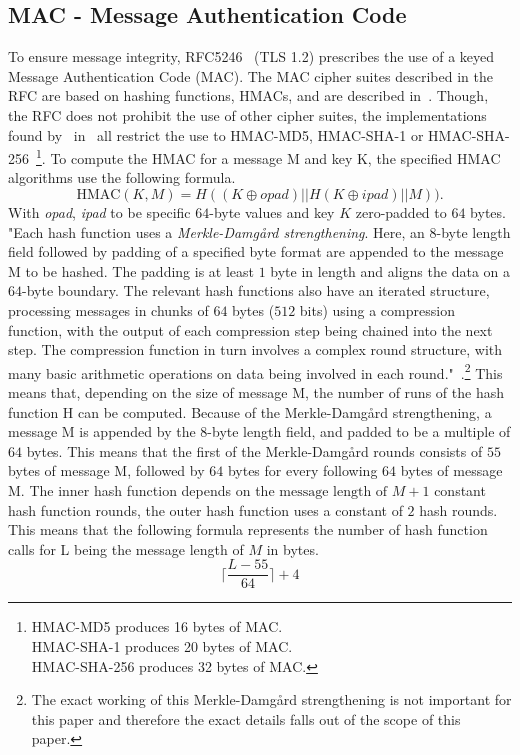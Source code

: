 \documentclass[10pt,conference,a4paper]{IEEEtran}
\begin{document}
\subsection{MAC - Message Authentication Code}
\label{sec:crypto:hmac}
To ensure message integrity, RFC5246~\cite{ietf2008transport} (TLS 1.2) prescribes the use of a keyed Message Authentication Code (MAC). The MAC cipher suites described in the RFC are based on hashing functions, HMACs, and are described in~\cite{krawczyk1997rfc}. Though, the RFC does not prohibit the use of other cipher suites, the implementations found by~\citeauthor{alfardan2013lucky} in~\cite{alfardan2013lucky} all restrict the use to HMAC-MD5, HMAC-SHA-1 or HMAC-SHA-256~\footnote{HMAC-MD5 produces 16 bytes of MAC.\\HMAC-SHA-1 produces 20 bytes of MAC.\\HMAC-SHA-256 produces 32 bytes of MAC.}. To compute the HMAC for a message M and key K, the specified HMAC algorithms use the following formula. 
\[ \text{HMAC}(K,M) = H((K \oplus opad)||H(K \oplus ipad)||M)). \]
With \textit{opad}, \textit{ipad} to be specific $64$-byte values and key $K$ zero-padded to $64$ bytes. "Each hash function uses a \textit{Merkle-Damg\aa rd strengthening}. Here, an 8-byte length field followed by padding of a specified byte format are appended to the message M to be hashed. The padding is at least $1$ byte in length and aligns the data on a $64$-byte boundary. The relevant hash functions also have an iterated structure, processing messages in chunks of $64$ bytes ($512$ bits) using a compression function, with the output of each compression step being chained into the next step. The compression function in turn involves a complex round structure, with many basic arithmetic operations on data being involved in each round."~\cite{alfardan2013lucky}.\footnote{The exact working of this Merkle-Damg\aa rd strengthening is not important for this paper and therefore the exact details falls out of the scope of this paper.}
This means that, depending on the size of message M, the number of runs of the hash function H can be computed. Because of the Merkle-Damg\aa rd strengthening, a message M is appended by the $8$-byte length field, and padded to be a multiple of $64$ bytes. This means that the first of the Merkle-Damg\aa rd rounds consists of $55$ bytes of message M, followed by $64$ bytes for every following $64$ bytes of message M. The inner hash function depends on the $\text{message length of } M + 1$ constant hash function rounds, the outer hash function uses a constant of $2$ hash rounds. This means that the following formula represents the number of hash function calls for L being the message length of $M$ in bytes.
\[ \lceil \frac{L - 55}{64} \rceil + 4 \]
\end{document}
